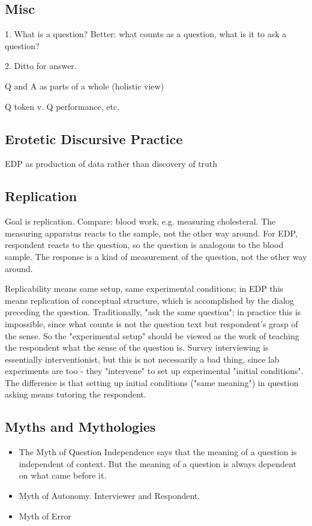\documentclass[11pt,twoside]{article}
\begin{document}
\subsection{Misc}

1.  What is a question?  Better: what counts as a question, what is it to ask a question?

2.  Ditto for answer.

Q and A as parts of a whole (holistic view)

Q token v. Q performance, etc.

\subsection{Erotetic Discursive Practice}


EDP as production of data rather than discovery of truth

\subsection{Replication}

Goal is replication.  Compare: blood work, e.g. measuring
cholesteral.  The measuring apparatus reacts to the sample, not the
other way around.  For EDP, respondent reacts to the question, so the
question is analogous to the blood sample.  The response is a kind of
measurement of the question, not the other way around.

Replicability means same setup, same experimental conditions; in EDP
this means replication of conceptual structure, which is accomplished
by the dialog preceding the question.  Traditionally, "ask the same
question"; in practice this is impossible, since what counts is not
the question text but respondent's grasp of the sense.  So the
"experimental setup" should be viewed as the work of teaching the
respondent what the sense of the question is.  Survey interviewing is
essentially interventionist, but this is not necessarily a bad thing,
since lab experiments are too - they "intervene" to set up
experimental "initial conditions".  The difference is that setting up
initial conditions ("same meaning") in question asking means tutoring
the respondent.

\subsection{Myths and Mythologies}

\begin{itemize}
\item The Myth of Question Independence says that the meaning of a
    question is independent of context.  But the meaning of a question
    is always dependent on what came before it.
\item Myth of Autonomy. Interviewer and Respondent.
\item Myth of Error
\end{itemize}
\end{document}
